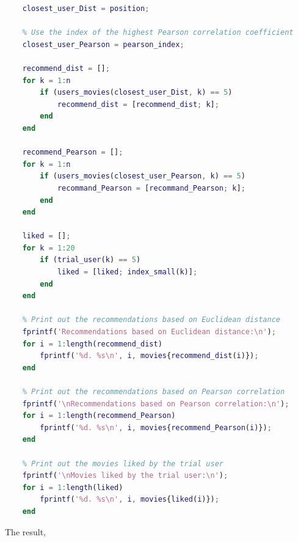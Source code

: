 \begin{lstlisting}[style=StyleCode, language=MATLAB]
	% Use the position of the smallest Euclidean distance
	closest_user_Dist = position;
	
	% Use the index of the highest Pearson correlation coefficient
	closest_user_Pearson = pearson_index;
	
	recommend_dist = [];
	for k = 1:n
		if (users_movies(closest_user_Dist, k) == 5)
			recommend_dist = [recommend_dist; k];
		end
	end
	
	recommend_Pearson = [];
	for k = 1:n
		if (users_movies(closest_user_Pearson, k) == 5)
			recommand_Pearson = [recommand_Pearson; k];
		end
	end
	
	liked = [];
	for k = 1:20
		if (trial_user(k) == 5)
			liked = [liked; index_small(k)];
		end
	end
	
	% Print out the recommendations based on Euclidean distance
	fprintf('Recommendations based on Euclidean distance:\n');
	for i = 1:length(recommend_dist)
		fprintf('%d. %s\n', i, movies{recommend_dist(i)});
	end
	
	% Print out the recommendations based on Pearson correlation
	fprintf('\nRecommendations based on Pearson correlation:\n');
	for i = 1:length(recommend_Pearson)
		fprintf('%d. %s\n', i, movies{recommend_Pearson(i)});
	end
	
	% Print out the movies liked by the trial user
	fprintf('\nMovies liked by the trial user:\n');
	for i = 1:length(liked)
		fprintf('%d. %s\n', i, movies{liked(i)});
	end
\end{lstlisting}

The result,

